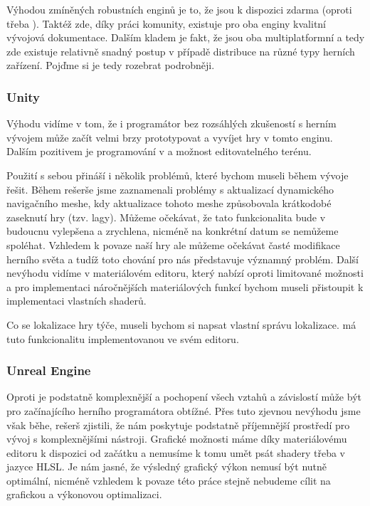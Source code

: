 Výhodou zmíněných robustních enginů je to, že jsou k dispozici zdarma (oproti třeba \CRY{}). Taktéž zde, díky práci komunity, existuje pro oba enginy kvalitní vývojová dokumentace. Dalším kladem je fakt, že jsou oba multiplatformní a tedy zde existuje relativně snadný postup v případě distribuce na různé typy herních zařízení. Pojďme si je tedy rozebrat podrobněji.

\subsubsection{Unity}
Výhodu \UN{} vidíme v tom, že i programátor bez rozsáhlých zkušeností s herním vývojem může začít velmi brzy prototypovat a vyvíjet hry v tomto enginu. Dalším pozitivem je programování v \CS{} a možnost editovatelného terénu.

Použití \UN{} s sebou přináší i několik problémů, které bychom museli během vývoje řešit. Během rešerše jsme zaznamenali problémy s aktualizací dynamického navigačního meshe, kdy aktualizace tohoto meshe způsobovala krátkodobé zaseknutí hry (tzv. lagy). Můžeme očekávat, že tato funkcionalita bude v budoucnu vylepšena a zrychlena, nicméně na konkrétní datum se nemůžeme spoléhat. Vzhledem k povaze naší hry ale můžeme očekávat časté modifikace herního světa a tudíž toto chování pro nás představuje významný problém. Další nevýhodu vidíme v materiálovém editoru, který nabízí oproti \UE{} limitované možnosti a pro implementaci náročnějších materiálových funkcí bychom museli přistoupit k implementaci vlastních shaderů.

Co se lokalizace hry týče, museli bychom si napsat vlastní správu lokalizace\citep{unity_loc}. \UE{} má tuto funkcionalitu implementovanou ve svém editoru\citep{ue_loc}.


\subsubsection{Unreal Engine}
Oproti \UN{} je \UE{} podstatně komplexnější a pochopení všech vztahů a závislostí může být pro začínajícího herního programátora obtížné. Přes tuto zjevnou nevýhodu jsme však běhe, rešerš zjistili, že \UE{} nám poskytuje podstatně příjemnější prostředí pro vývoj s komplexnějšími nástroji. Grafické možnosti máme díky materiálovému editoru k dispozici od začátku a nemusíme k tomu umět psát shadery třeba v jazyce HLSL. Je nám jasné, že výsledný grafický výkon nemusí být nutně optimální, nicméně vzhledem k povaze této práce stejně nebudeme cílit na grafickou a výkonovou optimalizaci.

